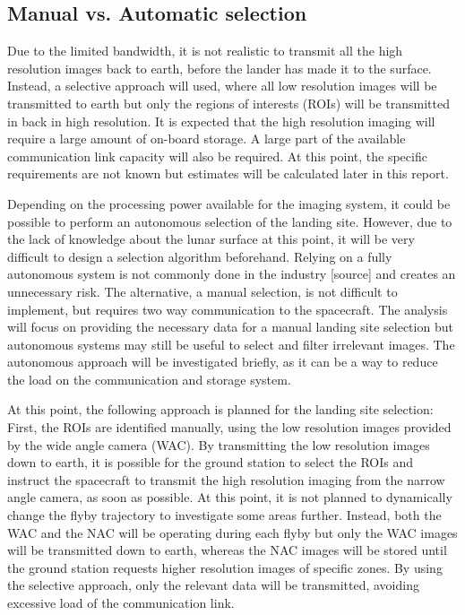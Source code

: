 \subsection{Manual vs. Automatic selection}
Due to the limited bandwidth, it is not realistic to transmit all the high resolution images back to earth, before the lander has made it to the surface. Instead, a selective approach will used, where all low resolution images will be transmitted to earth but only the regions of interests (ROIs) will be transmitted in back in high resolution. It is expected that the high resolution imaging will require a large amount of on-board storage. A large part of the available communication link capacity will also be required. At this point, the specific requirements are not known but estimates will be calculated later in this report.

Depending on the processing power available for the imaging system, it could be possible to perform an autonomous selection of the landing site. However, due to the lack of knowledge about the lunar surface at this point, it will be very difficult to design a selection algorithm beforehand. Relying on a fully autonomous system is not commonly done in the industry [source] and creates an unnecessary risk. The alternative, a manual selection, is not difficult to implement, but requires two way communication to the spacecraft. The analysis will focus on providing the necessary data for a manual landing site selection but autonomous systems may still be useful to select and filter irrelevant images. The autonomous approach will be investigated briefly, as it can be a way to reduce the load on the communication and storage system.    

At this point, the following approach is planned for the landing site selection: First, the ROIs are identified manually, using the low resolution images provided by the wide angle camera (WAC). By transmitting the low resolution images down to earth, it is possible for the ground station to select the ROIs and instruct the spacecraft to transmit the high resolution imaging from the narrow angle camera, as soon as possible.
At this point, it is not planned to dynamically change the flyby trajectory to investigate some areas further. Instead, both the WAC and the NAC will be operating during each flyby but only the WAC images will be transmitted down to earth, whereas the NAC images will be stored until the ground station requests higher resolution images of specific zones. By using the selective approach, only the relevant data will be transmitted, avoiding excessive load of the communication link.

